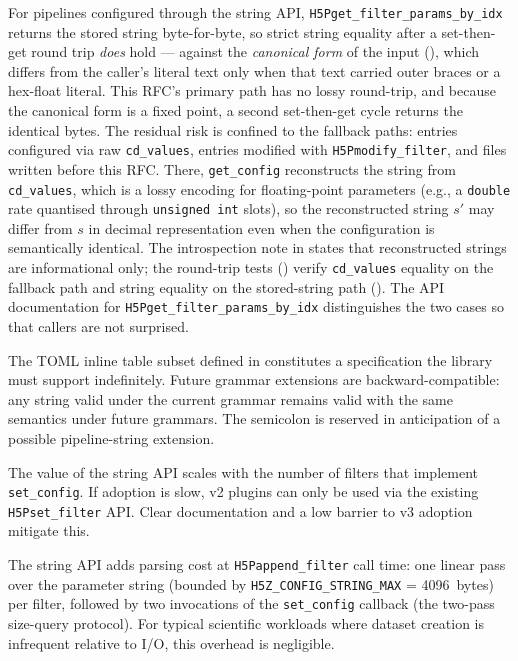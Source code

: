 \documentclass[../RFC-HDFG-2026-001.tex]{subfiles}
\begin{document}
For pipelines configured through the string API,
\texttt{H5Pget\_filter\_params\_by\_idx} returns
the stored string byte-for-byte, so strict string equality after a
set-then-get round trip \emph{does} hold --- against the \emph{canonical
form} of the input (), which differs
from the caller's literal text only when that text carried outer braces or
a hex-float literal.  This RFC's primary path has no lossy round-trip, and
because the canonical form is a fixed point, a second set-then-get cycle
returns the identical bytes.  The residual risk is confined to the fallback
paths: entries configured via raw \texttt{cd\_values}, entries modified
with \texttt{H5Pmodify\_filter}, and files written before this RFC.
There, \texttt{get\_config} reconstructs the string from
\texttt{cd\_values}, which is a lossy encoding for floating-point
parameters (e.g., a \texttt{double} rate quantised through
\texttt{unsigned int} slots), so the reconstructed string $s'$ may differ
from $s$ in decimal representation even when the configuration is
semantically identical.  The introspection note in
 states that reconstructed strings are
informational only; the round-trip tests
() verify \texttt{cd\_values}
equality on the fallback path and string equality on the stored-string
path ().  The API documentation for
\texttt{H5Pget\_filter\_params\_by\_idx} distinguishes the two cases so
that callers are not surprised.

The TOML inline table subset defined in 
constitutes a specification the library must support indefinitely. Future
grammar extensions are backward-compatible: any string valid under the current
grammar remains valid with the same semantics under future grammars. The
semicolon is reserved in anticipation of a possible pipeline-string extension.

The value of the string API scales with the number of
filters that implement \texttt{set\_config}. If adoption is slow, v2 plugins can only
be used via the existing \texttt{H5Pset\_filter} API. Clear documentation and a low
barrier to v3 adoption mitigate this.

The string API adds parsing cost at \texttt{H5Pappend\_filter} call time:
one linear pass over the parameter string (bounded by
\texttt{H5Z\_CONFIG\_STRING\_MAX} = 4096~bytes) per filter, followed by two
invocations of the \texttt{set\_config} callback (the two-pass size-query
protocol). For typical scientific workloads where dataset creation is
infrequent relative to I/O, this overhead is negligible.
\end{document}
